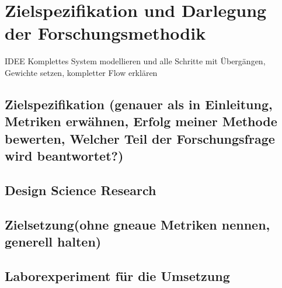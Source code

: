 \chapter{Zielspezifikation und Darlegung der Forschungsmethodik}


IDEE Komplettes System modellieren und alle Schritte mit Übergängen, Gewichte setzen, kompletter Flow erklären



\section{Zielspezifikation (genauer als in Einleitung, Metriken erwähnen, Erfolg meiner Methode bewerten, Welcher Teil der Forschungsfrage wird beantwortet?)}
\section{Design Science Research }
\section{Zielsetzung(ohne gneaue Metriken nennen, generell halten)}
\section{Laborexperiment für die Umsetzung}

